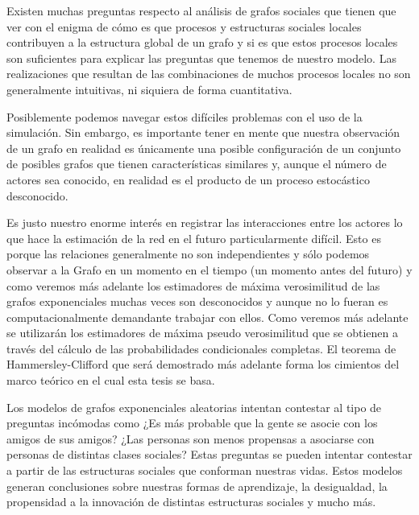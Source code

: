 Existen muchas preguntas respecto al análisis de grafos sociales que tienen que ver con el enigma de cómo es que procesos y estructuras sociales locales contribuyen a la estructura global de un grafo y si es que estos procesos locales son suficientes para explicar las preguntas que tenemos de nuestro modelo. Las realizaciones que resultan de las combinaciones de muchos procesos locales no son generalmente intuitivas, ni siquiera de forma cuantitativa. 

Posiblemente podemos navegar estos difíciles problemas con el uso de la simulación. Sin embargo, es importante tener en mente que nuestra observación de un grafo en realidad es únicamente una posible configuración de un conjunto de posibles grafos que tienen  características similares y, aunque el número de actores sea conocido, en realidad es el producto de un proceso estocástico desconocido.

Es justo nuestro enorme interés en registrar las interacciones entre los actores lo que hace la estimación de la red en el futuro particularmente difícil. Esto es porque las relaciones generalmente no son independientes y sólo podemos observar a la Grafo en un momento en el tiempo (un momento antes del futuro) y como veremos más adelante los estimadores de máxima verosimilitud de las grafos exponenciales muchas veces son desconocidos y aunque no lo fueran es computacionalmente demandante trabajar con ellos. Como veremos más adelante se utilizarán los estimadores de máxima pseudo verosimilitud que se obtienen a través del cálculo de las probabilidades condicionales completas. El teorema de Hammersley-Clifford que será demostrado más adelante forma los cimientos del marco teórico en el cual esta tesis se basa.

Los modelos de grafos exponenciales aleatorias intentan contestar al tipo de preguntas incómodas como ¿Es más probable que la gente se asocie con los amigos de sus amigos? ¿Las personas son menos propensas a asociarse con personas de distintas clases sociales? Estas preguntas se pueden intentar contestar a partir de las estructuras sociales que conforman nuestras vidas. Estos modelos generan conclusiones sobre nuestras formas de aprendizaje, la desigualdad, la propensidad a la innovación de distintas estructuras sociales y mucho más.
